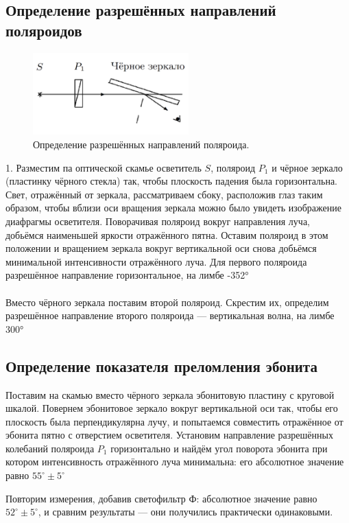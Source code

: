 \documentclass[11pt]{article}
\begin{document}
\subsection{Определение разрешённых направлений поляроидов}
\begin{figure}
    \includegraphics[width=6cm]{Screenshot_1.png}
    \caption{Определение разрешённых направлений поляроида.}
    \label{pic:1}
\end{figure}
1. Разместим па оптической скамье осветитель $ S $, поляроид $ P_1 $ и чёрное зеркало (пластинку чёрного стекла) так, чтобы плоскость падения была горизонтальна. Свет, отражённый от зеркала, рассматриваем сбоку, расположив глаз таким образом, чтобы вблизи оси вращения зеркала можно было увидеть изображение диафрагмы осветителя. Поворачивая поляроид вокруг направления луча, добьёмся наименьшей яркости отражённого пятна. Оставим поляроид в этом положении и вращением зеркала вокруг вертикальной оси снова добьёмся минимальной интенсивности отражённого луча.
Для первого поляроида разрешённое направление горизонтальное, на лимбе -352°
\\\\
Вместо чёрного зеркала поставим второй поляроид. Скрестим их, определим разрешённое направление второго поляроида --- вертикальная волна, на лимбе 300°


\subsection{Определение показателя преломления эбонита}
Поставим на скамью вместо чёрного зеркала эбонитовую пластину с круговой шкалой.
Повернем эбонитовое зеркало вокруг вертикальной оси так, чтобы его плоскость была перпендикулярна лучу, и попытаемся совместить отражённое от эбонита пятно с отверстием осветителя.
Установим направление разрешённых колебаний поляроида $ P_1 $ горизонтально и найдём угол поворота эбонита при котором интенсивность отражённого луча минимальна: его абсолютное значение равно $ 55^{\circ} \pm 5^{\circ} $

Повторим измерения, добавив светофильтр Ф: абсолютное значение равно $ 52^{\circ} \pm 5^{\circ} $, и сравним результаты --- они получились практически одинаковыми.
\end{document}
